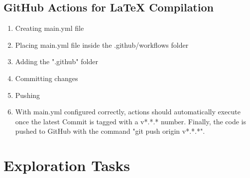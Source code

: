 \documentclass[12pt]{article}
\begin{document}
\subsection{GitHub Actions for LaTeX Compilation}
\begin{enumerate}[label=\arabic*.]
    \item Creating main.yml file
    \item Placing main.yml file inside the .github/workflows folder
    \item Adding the ".github" folder
    \item Committing changes
    \item Pushing
    \item With main.yml configured correctly, actions should automatically execute once the latest Commit is tagged with a v*.*.* number. Finally, the code is pushed to GitHub with the command "git push origin v*.*.*".
\end{enumerate}

\section{Exploration Tasks}
\end{document}
